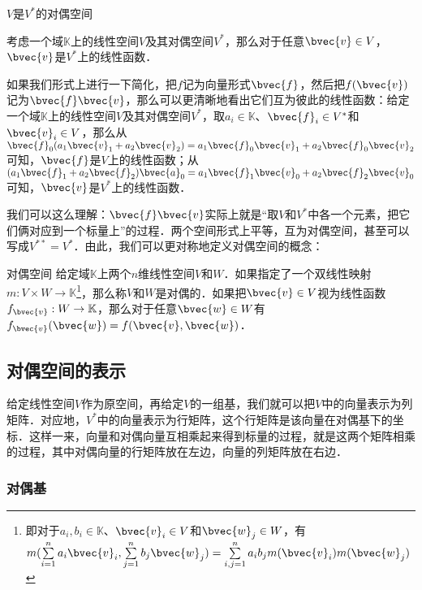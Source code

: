 \begin{theorem}{$V$是$V^*$的对偶空间}

考虑一个域$\mathbb{K}$上的线性空间$V$及其对偶空间$V^*$，那么对于任意$\bvec{v}\in V$，$\bvec{v}$是$V^*$上的线性函数．

\end{theorem}

如果我们形式上进行一下简化，把$f$记为向量形式$\bvec{f}$，然后把$f(\bvec{v})$记为$\bvec{f}\bvec{v}$，那么可以更清晰地看出它们互为彼此的线性函数：给定一个域$\mathbb{K}$上的线性空间$V$及其对偶空间$V^*$，取$a_i\in\mathbb{K}$、$\bvec{f}_i\in V^*$和$\bvec{v}_i\in V$，那么从$\bvec{f}_0(a_1\bvec{v}_1+a_2\bvec{v}_2)=a_1\bvec{f}_0\bvec{v}_1+a_2\bvec{f}_0\bvec{v}_2$可知，$\bvec{f}$是$V$上的线性函数；从$(a_1\bvec{f}_1+a_2\bvec{f}_2)\bvec{a}_0=a_1\bvec{f}_1\bvec{v}_0+a_2\bvec{f}_2\bvec{v}_0$可知，$\bvec{v}$是$V^*$上的线性函数．

我们可以这么理解：$\bvec{f}\bvec{v}$实际上就是“取$V$和$V^*$中各一个元素，把它们俩对应到一个标量上”的过程．两个空间形式上平等，互为对偶空间，甚至可以写成$V^{**}=V^*$．由此，我们可以更对称地定义对偶空间的概念：

\begin{definition}{对偶空间}
给定域$\mathbb{K}$上两个$n$维线性空间$V$和$W$．如果指定了一个双线性映射$m:V\times W\rightarrow\mathbb{K}$\footnote{即对于$a_i, b_i\in\mathbb{K}$、$\bvec{v}_i\in V$和$\bvec{w}_j\in W$，有$m(\sum\limits_{i=1}^na_i\bvec{v}_i,\sum\limits_{j=1}^nb_j\bvec{w}_j )=\sum\limits_{i, j=1}^na_ib_jm(\bvec{v}_i)m(\bvec{w}_j)$}，那么称$V$和$W$是对偶的．如果把$\bvec{v}\in V$视为线性函数$f_{\bvec{v}}:W\rightarrow\mathbb{K}$，那么对于任意$\bvec{w}\in W$有$f_{\bvec{v}}(\bvec{w})=f(\bvec{v}, \bvec{w})$．
\end{definition}


\subsection{对偶空间的表示}%

给定线性空间$V$作为原空间，再给定$V$的一组基，我们就可以把$V$中的向量表示为列矩阵．对应地，$V^*$中的向量表示为行矩阵，这个行矩阵是该向量在对偶基下的坐标．这样一来，向量和对偶向量互相乘起来得到标量的过程，就是这两个矩阵相乘的过程，其中对偶向量的行矩阵放在左边，向量的列矩阵放在右边．


\subsubsection{对偶基}

